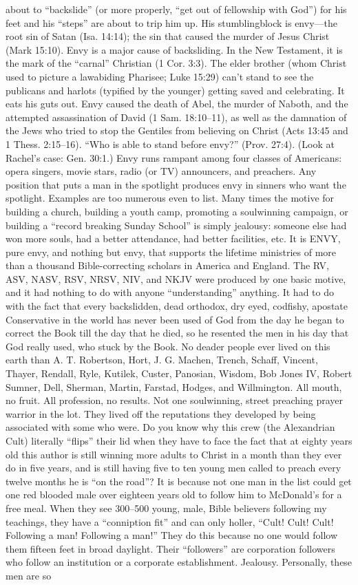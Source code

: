 about to “backslide” (or more properly, “get out of fellowship with God”) for his feet and his “steps” are about to trip him up. His stumblingblock is envy—the root sin of Satan (Isa. 14:14); the sin that caused the murder of Jesus Christ (Mark 15:10). Envy is a major cause of backsliding. In the New Testament, it is the mark of the “carnal” Christian (1 Cor. 3:3). The elder brother (whom Christ used to picture a lawabiding Pharisee; Luke 15:29) can’t stand to see the publicans and harlots (typified by the younger) getting saved and celebrating. It eats his guts out. Envy caused the death of Abel, the murder of Naboth, and the attempted assassination of David (1 Sam. 18:10--11), as well as the damnation of the Jews who tried to stop the Gentiles from believing on Christ (Acts 13:45 and 1 Thess. 2:15--16). “Who is able to stand before envy?” (Prov. 27:4). (Look at Rachel’s case: Gen. 30:1.) Envy runs rampant among four classes of Americans: opera singers, movie stars, radio (or TV) announcers, and preachers. Any position that puts a man in the spotlight produces envy in sinners who want the spotlight. Examples are too numerous even to list. Many times the motive for building a church, building a youth camp, promoting a soulwinning campaign, or building a “record breaking Sunday School” is simply jealousy: someone else had won more souls, had a better attendance, had better facilities,  etc.  It is ENVY, pure envy, and nothing but envy, that supports the lifetime ministries of more than a thousand Bible-correcting scholars in America and England. The RV, ASV, NASV, RSV, NRSV, NIV, and NKJV were produced by one basic motive, and it had nothing to do with anyone “understanding” anything. It had to do with the fact that every backslidden, dead orthodox, dry eyed, codfishy, apostate Conservative in the world has never been used of God from the day he began to correct the Book till the day that he died, so he resented the men in his day that God really used, who stuck by the Book. No deader people ever lived on this earth than A. T. Robertson, Hort, J. G. Machen, Trench, Schaff, Vincent, Thayer, Rendall, Ryle, Kutilek, Custer, Panosian, Wisdom, Bob Jones IV, Robert Sumner, Dell, Sherman, Martin, Farstad, Hodges, and Willmington. All mouth, no fruit. All profession, no results. Not one soulwinning, street preaching prayer warrior in the lot. They lived off the reputations they developed by being associated with some who were.  Do you know why this crew (the Alexandrian Cult) literally “flips” their lid when they have to face the fact that at eighty years old this author is still winning more adults to Christ in a month than they ever do in five years, and is still having five to ten young men called to preach every twelve months he is “on the road”? It is because not one man in the list could get one red blooded male over eighteen years old to follow him to McDonald’s for a free meal. When they see 300--500 young, male, Bible believers following my teachings, they have a “conniption fit” and can only holler, “Cult! Cult! Cult! Following a man! Following a man!” They do this because no one would follow them fifteen feet in broad daylight. Their “followers” are corporation followers who follow an institution or a corporate establishment. Jealousy. Personally, these men are so 